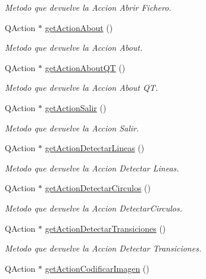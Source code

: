 \begin{DoxyCompactItemize}
\begin{DoxyCompactList}\small\item\em Metodo que devuelve la Accion Abrir Fichero. \end{DoxyCompactList}\item 
Q\+Action $\ast$ \hyperlink{classCAplicacion_a46ac4ceff3c82283f159c467a5cde6d2}{get\+Action\+About} ()
\begin{DoxyCompactList}\small\item\em Metodo que devuelve la Accion About. \end{DoxyCompactList}\item 
Q\+Action $\ast$ \hyperlink{classCAplicacion_a8f0d5c5ad866644453dcedb5a45c2044}{get\+Action\+About\+QT} ()
\begin{DoxyCompactList}\small\item\em Metodo que devuelve la Accion About QT. \end{DoxyCompactList}\item 
Q\+Action $\ast$ \hyperlink{classCAplicacion_a0326521d3aacf2c129f8b63ce6dd51b1}{get\+Action\+Salir} ()
\begin{DoxyCompactList}\small\item\em Metodo que devuelve la Accion Salir. \end{DoxyCompactList}\item 
Q\+Action $\ast$ \hyperlink{classCAplicacion_a44d0d263883784b27191c34493a56154}{get\+Action\+Detectar\+Lineas} ()
\begin{DoxyCompactList}\small\item\em Metodo que devuelve la Accion Detectar Lineas. \end{DoxyCompactList}\item 
Q\+Action $\ast$ \hyperlink{classCAplicacion_af4811205741a71ee2f897491119e2a85}{get\+Action\+Detectar\+Circulos} ()
\begin{DoxyCompactList}\small\item\em Metodo que devuelve la Accion Detectar\+Circulos. \end{DoxyCompactList}\item 
Q\+Action $\ast$ \hyperlink{classCAplicacion_a7ae388e051747fbc0aa9a47696d5d5da}{get\+Action\+Detectar\+Transiciones} ()
\begin{DoxyCompactList}\small\item\em Metodo que devuelve la Accion Detectar Transiciones. \end{DoxyCompactList}\item 
Q\+Action $\ast$ \hyperlink{classCAplicacion_a298625cc516fc874fd53f73fcf2ca883}{get\+Action\+Codificar\+Imagen} ()

\end{DoxyCompactItemize}
